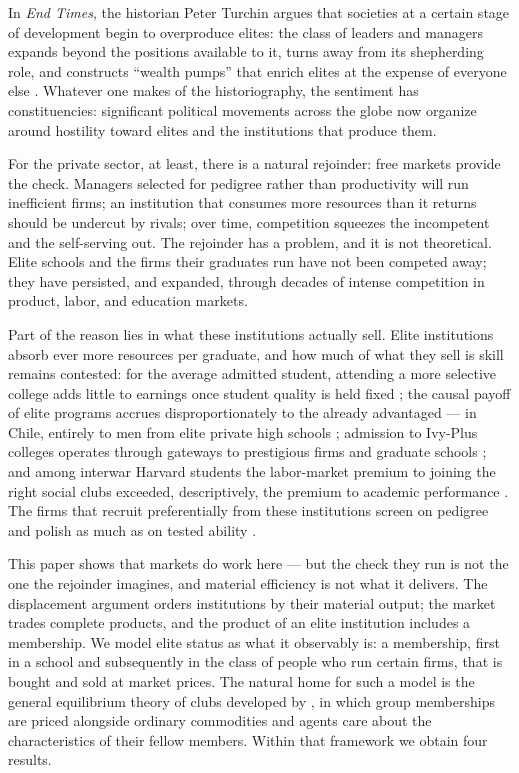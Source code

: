 \documentclass[12pt,letterpaper]{article}
\theoremstyle{definition}
\begin{document}
In \emph{End Times}, the historian Peter Turchin argues that societies at a certain stage of development begin to overproduce elites: the class of leaders and managers expands beyond the positions available to it, turns away from its shepherding role, and constructs ``wealth pumps'' that enrich elites at the expense of everyone else \citep{turchin2023endtimes}.
Whatever one makes of the historiography, the sentiment has constituencies: significant political movements across the globe now organize around hostility toward elites and the institutions that produce them.

For the private sector, at least, there is a natural rejoinder: free markets provide the check.
Managers selected for pedigree rather than productivity will run inefficient firms; an institution that consumes more resources than it returns should be undercut by rivals; over time, competition squeezes the incompetent and the self-serving out.
The rejoinder has a problem, and it is not theoretical.
Elite schools and the firms their graduates run have not been competed away; they have persisted, and expanded, through decades of intense competition in product, labor, and education markets.

Part of the reason lies in what these institutions actually sell.
Elite institutions absorb ever more resources per graduate, and how much of what they sell is skill remains contested: for the average admitted student, attending a more selective college adds little to earnings once student quality is held fixed \citep[with the notable exceptions of disadvantaged students, and with returns tracking college resources]{dalekrueger2002}; the causal payoff of elite programs accrues disproportionately to the already advantaged --- in Chile, entirely to men from elite private high schools \citep{zimmerman2019elite}; admission to Ivy-Plus colleges operates through gateways to prestigious firms and graduate schools \citep{chettydemingfriedman2026}; and among interwar Harvard students the labor-market premium to joining the right social clubs exceeded, descriptively, the premium to academic performance \citep{michelmanpricezimmerman2022}.
The firms that recruit preferentially from these institutions screen on pedigree and polish as much as on tested ability \citep{rivera2015pedigree}.

This paper shows that markets do work here --- but the check they run is not the one the rejoinder imagines, and material efficiency is not what it delivers.
The displacement argument orders institutions by their material output; the market trades complete products, and the product of an elite institution includes a membership.
We model elite status as what it observably is: a membership, first in a school and subsequently in the class of people who run certain firms, that is bought and sold at market prices.
The natural home for such a model is the general equilibrium theory of clubs developed by \citet{ellickson1999clubs,ellickson2001clubs,ellickson2006organization}, in which group memberships are priced alongside ordinary commodities and agents care about the characteristics of their fellow members.
Within that framework we obtain four results.
\end{document}
